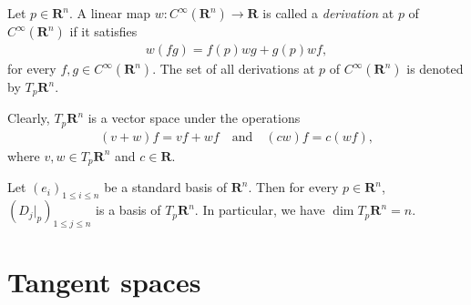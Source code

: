 \begin{definition}
    Let $p \in \mathbf{R}^n$. A linear map $w : C^\infty(\mathbf{R}^n) \to \mathbf{R}$ is called a \emph{derivation} at $p$ of $C^\infty(\mathbf{R}^n)$ if it satisfies
    \begin{align*}
        w(fg) = f(p)w g + g(p)w f,
    \end{align*}
    for every $f, g \in C^\infty(\mathbf{R}^n)$. The set of all derivations at $p$ of $C^\infty(\mathbf{R}^n)$ is denoted by $T_p\mathbf{R}^n$.
\end{definition}

Clearly, $T_p\mathbf{R}^n$ is a vector space under the operations
    \begin{align*}
        (v + w)f = v f + w f
        \quad\text{and}\quad
        (cw)f = c(w f),
    \end{align*}
where $v, w \in T_p\mathbf{R}^n$ and $c \in \mathbf{R}$.

\begin{proposition}\label{lem:basis of tangent space on R^n}
    Let $(e_i)_{1 \leq i \leq n}$ be a standard basis of $\mathbf{R}^n$. Then for every $p \in \mathbf{R}^n$, $(D_{j}|_p)_{1 \leq j \leq n}$ is a basis of $T_p\mathbf{R}^n$. In particular, we have $\dim{T_p\mathbf{R}^n} = n$.
\end{proposition}

\begin{comment}
\begin{proof}
    We verify that $(D_{e_j}|_p)_{1 \leq j \leq n}$ spans $T_p\mathbf{R}^n$. Since $p$ can be written as $p = a_je_j$ for $a_j \in \mathbf{R}$. Let $f \in C^\infty(\mathbf{R}^n)$. By Taylor's theorem, we have
    \begin{align*}
        f(x) = f(p) + \sum_{j = 1}^{n}D_{e_j}f(p)(x_j - p_j) + \sum_{i, j = 1}^{n}(x_i - p_i)(x_j - p_j)\int_{0}^{1}(1 - t)D_{e_i}D_{e_j}f(p + t(x - p))dt.
    \end{align*}
    Then
    \begin{align*}
        wf &= w(f(p)) + \sum_{j = 1}^{n}w((x_j - p_j)D_{e_j}|_pf)\\
        &= \sum_{j = 1}^{n}(w(x_j) - w(a_j))D_{e_j}|_pf\\
        &= \sum_{j = 1}^{n}w(x_j)D_{e_j}|_pf.
    \end{align*}
\end{proof}
\end{comment}


\section{Tangent spaces}

